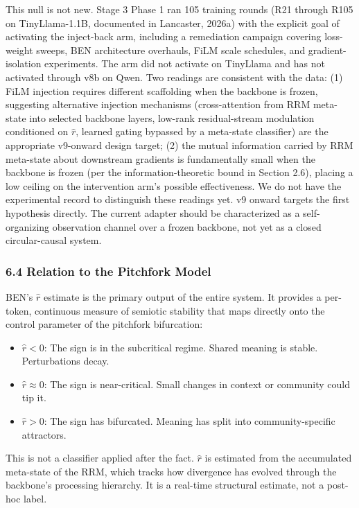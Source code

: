 \documentclass[
  11pt]{article}
\providecommand{\tightlist}{%
  \setlength{\itemsep}{0pt}\setlength{\parskip}{0pt}}
\begin{document}
This null is not new. Stage 3 Phase 1 ran 105 training rounds (R21
through R105 on TinyLlama-1.1B, documented in Lancaster, 2026a) with the
explicit goal of activating the inject-back arm, including a remediation
campaign covering loss-weight sweeps, BEN architecture overhauls, FiLM
scale schedules, and gradient-isolation experiments. The arm did not
activate on TinyLlama and has not activated through v8b on Qwen. Two
readings are consistent with the data: (1) FiLM injection requires
different scaffolding when the backbone is frozen, suggesting
alternative injection mechanisms (cross-attention from RRM meta-state
into selected backbone layers, low-rank residual-stream modulation
conditioned on \(\hat{r}\), learned gating bypassed by a meta-state
classifier) are the appropriate v9-onward design target; (2) the mutual
information carried by RRM meta-state about downstream gradients is
fundamentally small when the backbone is frozen (per the
information-theoretic bound in Section 2.6), placing a low ceiling on
the intervention arm's possible effectiveness. We do not have the
experimental record to distinguish these readings yet. v9 onward targets
the first hypothesis directly. The current adapter should be
characterized as a self-organizing observation channel over a frozen
backbone, not yet as a closed circular-causal system.

\subsubsection{6.4 Relation to the Pitchfork
Model}\label{relation-to-the-pitchfork-model}

BEN's \(\hat{r}\) estimate is the primary output of the entire system.
It provides a per-token, continuous measure of semiotic stability that
maps directly onto the control parameter of the pitchfork bifurcation:

\begin{itemize}
\tightlist
\item
  \(\hat{r} < 0\): The sign is in the subcritical regime. Shared meaning
  is stable. Perturbations decay.
\item
  \(\hat{r} \approx 0\): The sign is near-critical. Small changes in
  context or community could tip it.
\item
  \(\hat{r} > 0\): The sign has bifurcated. Meaning has split into
  community-specific attractors.
\end{itemize}

This is not a classifier applied after the fact. \(\hat{r}\) is
estimated from the accumulated meta-state of the RRM, which tracks how
divergence has evolved through the backbone's processing hierarchy. It
is a real-time structural estimate, not a post-hoc label.
\end{document}
